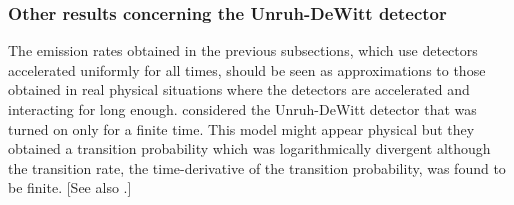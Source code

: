 \documentclass[12pt,nofootinbib,floatfix,aps,prd,showpacs,amsmath,amssymb,eqsecnum]{revtex4-2}
\begin{document}
\subsubsection{Other results concerning the Unruh-DeWitt detector}
\label{subsubsection:otherresults}

The emission rates obtained in the previous subsections,
which use detectors accelerated uniformly for all times, 
should be seen as approximations to those
obtained in real physical situations where the detectors
are accelerated and interacting for long enough. 
\textcite{Svaiteretal1992} 
considered the Unruh-DeWitt detector that was turned on only for a 
finite time. This model might appear physical but 
they obtained a transition probability which was logarithmically
divergent although the transition rate, the time-derivative of the
transition probability, was found to be finite.
[See also \textcite{Sriramkumaretal96}.]
\end{document}
